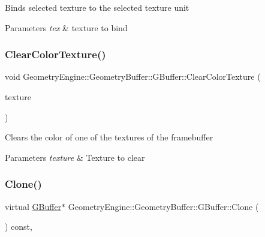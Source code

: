 Binds selected texture to the selected texture unit 
\begin{DoxyParams}{Parameters}
{\em tex} & texture to bind \\
\hline
\end{DoxyParams}
\mbox{\label{class_geometry_engine_1_1_geometry_buffer_1_1_g_buffer_abf39c85cb87eaf0475205b59333253c0}} 
\subsubsection{\texorpdfstring{ClearColorTexture()}{ClearColorTexture()}}
{\footnotesize\ttfamily void Geometry\+Engine\+::\+Geometry\+Buffer\+::\+G\+Buffer\+::\+Clear\+Color\+Texture (\begin{DoxyParamCaption}\item[{\mbox{\hyperlink{class_geometry_engine_1_1_geometry_buffer_1_1_g_buffer_a718dceafcac1915f7de061108597e1cc}{G\+B\+U\+F\+F\+E\+R\+\_\+\+T\+E\+X\+T\+U\+R\+E\+\_\+\+T\+Y\+PE}}}]{texture }\end{DoxyParamCaption})}

Clears the color of one of the textures of the framebuffer 
\begin{DoxyParams}{Parameters}
{\em texture} & Texture to clear \\
\hline
\end{DoxyParams}
\mbox{\label{class_geometry_engine_1_1_geometry_buffer_1_1_g_buffer_af993f8c23f7e78051f3071be4873af9d}} 
\subsubsection{\texorpdfstring{Clone()}{Clone()}}
{\footnotesize\ttfamily virtual \mbox{\hyperlink{class_geometry_engine_1_1_geometry_buffer_1_1_g_buffer}{G\+Buffer}}$\ast$ Geometry\+Engine\+::\+Geometry\+Buffer\+::\+G\+Buffer\+::\+Clone (\begin{DoxyParamCaption}{ }\end{DoxyParamCaption}) const\hspace{0.3cm}{\ttfamily [inline]}, {\ttfamily [virtual]}}

